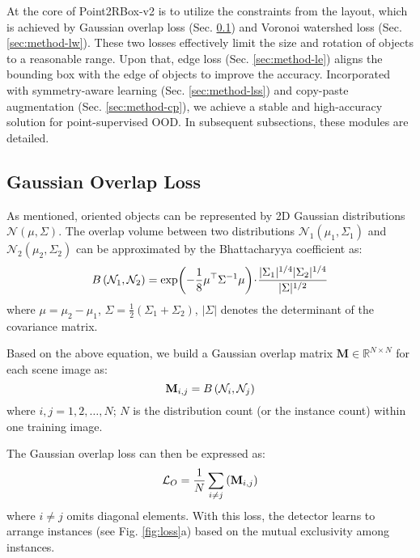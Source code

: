 At the core of Point2RBox-v2 is to utilize the constraints from the layout, which is achieved by Gaussian overlap loss (Sec. \ref{sec:method-lo}) and Voronoi watershed loss (Sec. \ref{sec:method-lw}). These two losses effectively limit the size and rotation of objects to a reasonable range. Upon that, edge loss (Sec. \ref{sec:method-le}) aligns the bounding box with the edge of objects to improve the accuracy. Incorporated with symmetry-aware learning (Sec. \ref{sec:method-lss}) and copy-paste augmentation (Sec. \ref{sec:method-cp}), we achieve a stable and high-accuracy solution for point-supervised OOD. In subsequent subsections, these modules are detailed. 

\subsection{Gaussian Overlap Loss}
\label{sec:method-lo}

As mentioned, oriented objects can be represented by 2D Gaussian distributions $\mathcal{N}(\mu, \Sigma)$. The overlap volume between two distributions $\mathcal{N}_1(\mu_1, \Sigma_1)$ and $\mathcal{N}_2(\mu_2, \Sigma_2)$ can be approximated by the Bhattacharyya coefficient \cite{yang2023detecting} as:
\begin{equation} \setlength\abovedisplayskip{6pt} \setlength\belowdisplayskip{6pt}
B\left(\mathcal{N}_1, \mathcal{N}_2 \right) = \exp\!\left( - \frac{1}{8} \mu^\top \Sigma^{-1} \mu \right) \!\cdot\! \frac{|\Sigma_1|^{1/4} |\Sigma_2|^{1/4}}{| \Sigma |^{1/2}}
\end{equation}
where $\mu = \mu_2 - \mu_1$, $\Sigma = \frac{1}{2}(\Sigma_1 + \Sigma_2)$, $ |\Sigma| $ denotes the determinant of the covariance matrix.

Based on the above equation, we build a Gaussian overlap matrix $\mathbf{M} \in \mathbb{R}^{N\times N}$ for each scene image as:
\begin{equation} \setlength\abovedisplayskip{6pt} \setlength\belowdisplayskip{6pt}
\mathbf{M}_{i,j} = B\left ( \mathcal{N}_i, \mathcal{N}_j \right )
\end{equation}
where $i,j = 1, 2, \dots, N$; $N$ is the distribution count (or the instance count) within one training image.

The Gaussian overlap loss can then be expressed as:
\begin{equation} \setlength\abovedisplayskip{6pt} \setlength\belowdisplayskip{6pt}
\mathcal{L}_O = \frac{1}{N} \sum_{i \neq j}^{}  \left ( \mathbf{M}_{i,j} \right )
\end{equation}
where $i \neq j$ omits diagonal elements.
With this loss, the detector learns to arrange instances (see Fig. \ref{fig:loss}a) based on the mutual exclusivity among instances.

